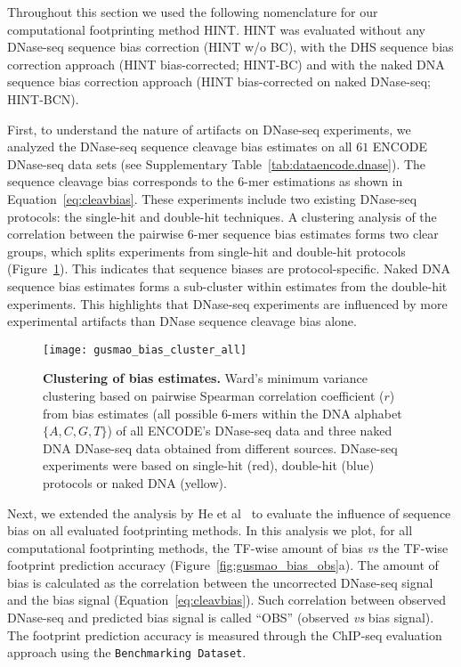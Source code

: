 Throughout this section we used the following nomenclature for our computational footprinting method HINT. HINT was evaluated without any DNase-seq sequence bias correction (HINT w/o BC), with the DHS sequence bias correction approach (HINT bias-corrected; HINT-BC) and with the naked DNA sequence bias correction approach (HINT bias-corrected on naked DNase-seq; HINT-BCN).


First, to understand the nature of artifacts on DNase-seq experiments, we analyzed the DNase-seq sequence cleavage bias estimates on all $61$ ENCODE DNase-seq data sets (see Supplementary Table~\ref{tab:dataencode.dnase}). The sequence cleavage bias corresponds to the $6$-mer estimations as shown in Equation~\ref{eq:cleavbias}. These experiments include two existing DNase-seq protocols: the single-hit and double-hit techniques. A clustering analysis of the correlation between the pairwise $6$-mer sequence bias estimates forms two clear groups, which splits experiments from single-hit and double-hit protocols (Figure~\ref{fig:gusmao_bias_cluster_all}). This indicates that sequence biases are protocol-specific. Naked DNA sequence bias estimates forms a sub-cluster within estimates from the double-hit experiments. This highlights that DNase-seq experiments are influenced by more experimental artifacts than DNase sequence cleavage bias alone.

\begin{figure}[h!]
\centering
\texttt{[image: gusmao\_bias\_cluster\_all]}
\caption[Clustering of bias estimates]{\textbf{Clustering of bias estimates.} Ward's minimum variance clustering based on pairwise Spearman correlation coefficient ($r$) from bias estimates (all possible $6$-mers within the DNA alphabet $\{A, C, G, T\}$) of all ENCODE's DNase-seq data and three naked DNA DNase-seq data obtained from different sources. DNase-seq experiments were based on single-hit (red), double-hit (blue) protocols or naked DNA (yellow).}
\label{fig:gusmao_bias_cluster_all}
\end{figure}

Next, we extended the analysis by He et al~\cite{he2014} to evaluate the influence of sequence bias on all evaluated footprinting methods. In this analysis we plot, for all computational footprinting methods, the TF-wise amount of bias \emph{vs} the TF-wise footprint prediction accuracy (Figure~\ref{fig:gusmao_bias_obs}a). The amount of bias is calculated as the correlation between the uncorrected DNase-seq signal and the bias signal (Equation~\ref{eq:cleavbias}). Such correlation between observed DNase-seq and predicted bias signal is called ``OBS'' (observed \emph{vs} bias signal). The footprint prediction accuracy is measured through the ChIP-seq evaluation approach using the {\tt Benchmarking Dataset}.

